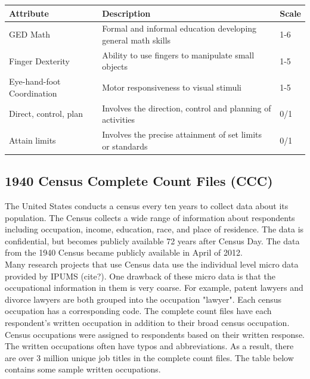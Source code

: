 \documentclass[12pt]{article}
\begin{document}
    \begin{table}[h!]
      \centering
      \begin{tabular}{|l|l|l|}
      \hline
      \textbf{Attribute}         & \textbf{Description}                                                   & \textbf{Scale} \\ \hline
      GED Math                   & Formal and informal education developing general math skills           & 1-6            \\ \hline
      Finger Dexterity           & Ability to use fingers to manipulate small objects                     & 1-5            \\ \hline
      Eye-hand-foot Coordination & Motor responsiveness to visual stimuli                                 & 1-5            \\ \hline
      Direct, control, plan      & Involves the direction, control and planning of activities & 0/1            \\ \hline
      Attain limits              & Involves the precise attainment of set limits or standards & 0/1            \\ \hline
      \end{tabular}
    \end{table}


  \subsection{1940 Census Complete Count Files (CCC)}
  The United States conducts a census every ten years to collect data about its population. The Census collects a wide range of information about respondents including occupation, income, education, race, and place of residence. The data is confidential, but becomes publicly available 72 years after Census Day. The data from the 1940 Census became publicly available in April of 2012.\\

  Many research projects that use Census data use the individual level micro data provided by IPUMS (cite?). One drawback
  of these micro data is that the occupational information in them is very coarse. For example, patent lawyers and divorce lawyers are both grouped into the occupation "lawyer". Each census occupation has a corresponding code. The complete count files have each respondent's written occupation in addition to their broad census occupation. Census occupations were assigned to respondents based on their written response. The written occupations often have typos and abbreviations. As a result, there are over 3 million unique job titles in the complete count files. The table below contains some sample written occupations.
\end{document}
